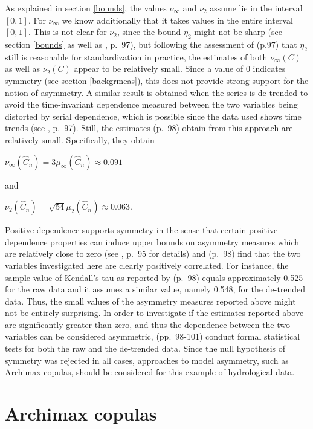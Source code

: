\documentclass[
]{krantz}
\begin{document}
As explained in section \ref{bounds}, the values \(\nu_\infty\) and \(\nu_2\) assume lie in the interval \([0,1]\). For \(\nu_\infty\) we know additionally that it takes values in the entire interval \([0,1]\). This is not clear for \(\nu_2\), since the bound \(\eta_2\) might not be sharp (see section \ref{bounds} as well as \citet{genest2013}, p.~97), but following the assessment of \citet{genest2013} (p.97) that \(\eta_2\) still is reasonable for standardization in practice, the estimates of both \(\nu_{\infty}(C)\) as well as \(\nu_2(C)\) appear to be relatively small. Since a value of 0 indicates symmetry (see section \ref{backgrmeas}), this does not provide strong support for the notion of asymmetry.
A similar result is obtained when the series is de-trended to avoid the time-invariant dependence measured between the two variables being distorted by serial dependence, which is possible since the data used shows time trends (see \citet{genest2013}, p.~97). Still, the estimates \citet{genest2013} (p.~98) obtain from this approach are relatively small. Specifically, they obtain

\(\nu_\infty(\hat{C}_n) = 3\mu_{\infty}(\hat{C}_n) \approx 0.091\)

and

\(\nu_2(\hat{C}_n) = \sqrt{54} \mu_2(\hat{C}_n) \approx 0.063.\)

Positive dependence supports symmetry in the sense that certain positive dependence properties can induce upper bounds on asymmetry measures which are relatively close to zero (see \citet{genest2013}, p.~95 for details) and \citet{genest2013} (p.~98) find that the two variables investigated here are clearly positively correlated. For instance, the sample value of Kendall's tau as reported by \citet{genest2013} (p.~98) equals approximately 0.525 for the raw data and it assumes a similar value, namely 0.548, for the de-trended data. Thus, the small values of the asymmetry measures reported above might not be entirely surprising. In order to investigate if the estimates reported above are significantly greater than zero, and thus the dependence between the two variables can be considered asymmetric, \citet{genest2013} (pp.~98-101) conduct formal statistical tests for both the raw and the de-trended data. Since the null hypothesis of symmetry was rejected in all cases, approaches to model asymmetry, such as Archimax copulas, should be considered for this example of hydrological data.

\section{Archimax copulas}\label{archi}
\end{document}
